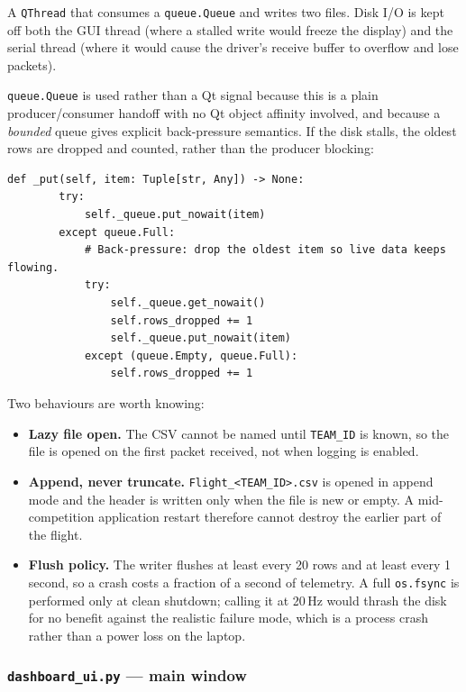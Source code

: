 \documentclass[11pt,a4paper]{article}
\newcommand{\file}[1]{\texttt{#1}}
\newcommand{\code}[1]{\texttt{#1}}
\begin{document}
A \code{QThread} that consumes a \code{queue.Queue} and writes two files.
Disk I/O is kept off both the GUI thread (where a stalled write would freeze
the display) and the serial thread (where it would cause the driver's receive
buffer to overflow and lose packets).

\code{queue.Queue} is used rather than a Qt signal because this is a plain
producer/consumer handoff with no Qt object affinity involved, and because a
\emph{bounded} queue gives explicit back-pressure semantics. If the disk
stalls, the oldest rows are dropped and counted, rather than the producer
blocking:

\begin{lstlisting}[caption={Non-blocking, never-raising enqueue, from \file{csv\_logger.py}.},label={lst:queue}]
    def _put(self, item: Tuple[str, Any]) -> None:
        try:
            self._queue.put_nowait(item)
        except queue.Full:
            # Back-pressure: drop the oldest item so live data keeps flowing.
            try:
                self._queue.get_nowait()
                self.rows_dropped += 1
                self._queue.put_nowait(item)
            except (queue.Empty, queue.Full):
                self.rows_dropped += 1
\end{lstlisting}

Two behaviours are worth knowing:

\begin{itemize}
  \item \textbf{Lazy file open.} The CSV cannot be named until
        \code{TEAM\_ID} is known, so the file is opened on the first packet
        received, not when logging is enabled.
  \item \textbf{Append, never truncate.} \file{Flight\_<TEAM\_ID>.csv} is
        opened in append mode and the header is written only when the file is
        new or empty. A mid-competition application restart therefore cannot
        destroy the earlier part of the flight.
  \item \textbf{Flush policy.} The writer flushes at least every 20 rows and
        at least every 1\,second, so a crash costs a fraction of a second of
        telemetry. A full \code{os.fsync} is performed only at clean shutdown;
        calling it at 20\,Hz would thrash the disk for no benefit against the
        realistic failure mode, which is a process crash rather than a power
        loss on the laptop.
\end{itemize}

\subsubsection{\file{dashboard\_ui.py} --- main window}
\end{document}
